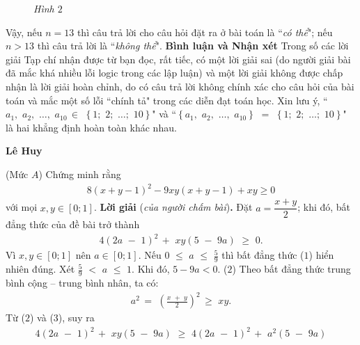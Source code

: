 \begin{multicols}{2}
\begin{figure}[H]
		\caption{\small\textit{\color{thachthuctoanhoc}Hình $2$}}
		\vspace*{-10pt}
	\end{figure}
	Vậy, nếu $n = 13$ thì câu trả lời cho câu hỏi đặt ra ở bài toán là ``\textit{có thể}"; nếu $n > 13$ thì câu trả lời là ``\textit{không thể}".
	\vskip 0.05cm
	\textbf{Bình luận và Nhận xét}
	\vskip 0.05cm
	Trong số các lời giải Tạp chí nhận được từ bạn đọc, rất tiếc, có một lời giải sai (do người giải bài đã mắc khá nhiều lỗi logic trong các lập luận) và một lời giải không được chấp nhận là lời giải hoàn chỉnh, do có câu trả lời không chính xác cho câu hỏi của bài toán và mắc một số lỗi ``chính tả" trong các diễn đạt toán học.
	\vskip 0.05cm
	Xin lưu ý, ``${a_1},\,\,{a_2},\,\, \ldots ,\,\,{a_{10}}\, \in \,\,\left\{ {1;\,\,2;\,\, \ldots ;\,\,10} \right\}$" và ``$\left\{ {{a_1},\,\,{a_2},\,\, \ldots ,\,\,{a_{10}}} \right\}\,\, = \,\,\left\{ {1;\,\,2;\,\, \ldots ;\,\,10} \right\}$" là hai khẳng định hoàn toàn khác nhau.
	\begin{flushright}
		\textbf{Lê Huy}
	\end{flushright}
	{}
	(Mức $A$) Chứng minh rằng
	\begin{align*}
		8(x+y-1)^2-9xy(x+y-1)+xy\ge0
	\end{align*}
	với mọi $x,y\in[0;1]$. 
	\vskip 0.05cm
	\textbf{Lời giải} (\textit{của người chấm bài})\textbf{.}
	\vskip 0.05cm
	Đặt $a = \dfrac{x + y}{2}$; khi đó, bất đẳng thức của đề bài trở thành
	\begin{align*}
		4{\left( {2a\,\, - \,\,1} \right)^2}\, + \,\,xy\left( {5\,\, - \,\,9a} \right)\,\, \ge \,\,0. \tag{$1$}
	\end{align*}
	Vì $x, y \in [0; 1]$ nên $a \in [0; 1]$.
	\vskip 0.05cm
	Nếu  $0\,\, \le \,\,a\,\, \le \,\,\frac{5}{9}$ thì bất đẳng thức ($1$) hiển nhiên đúng.
	\vskip 0.05cm
	Xét $\frac{5}{9}\,\, < \,\,a\,\, \le \,\,1$.
	\vskip 0.05cm  
	Khi đó, $5 - 9a < 0.$ \hfill ($2$)
	\vskip 0.05cm
	Theo bất đẳng thức trung bình cộng -- trung bình nhân, ta có:
	\begin{align*}
		{a^2}\, = \,\,{\left( {\frac{{x\,\, + \,\,y}}{2}} \right)^2}\, \ge \,\,xy. \tag{$3$}
	\end{align*}
	Từ ($2$) và ($3$), suy ra
	\begin{align*}
			4{\left( {2a\,\, - \,\,1} \right)^2}\, + \,\,xy\left( {5\,\, - \,\,9a} \right)\,\, \ge \,\,4{\left( {2a\,\, - \,\,1} \right)^2}\, + \,\,{a^2}\left( {5\,\, - \,\,9a} \right)\\

\end{align*}
\end{multicols}
